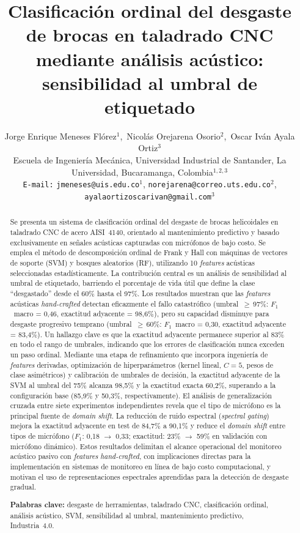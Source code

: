 \documentclass[10pt,twocolumn]{article}
\title{\textbf{Clasificación ordinal del desgaste de brocas en taladrado CNC
mediante análisis acústico: sensibilidad al umbral de etiquetado}}
\author{
  Jorge Enrique Meneses Flórez$^{1}$,\,
  Nicolás Orejarena Osorio$^{2}$,\,
  Oscar Iván Ayala Ortiz$^{3}$\\[4pt]
  {\small Escuela de Ingeniería Mecánica, Universidad Industrial de Santander, La Universidad, Bucaramanga, Colombia$^{1,2,3}$}\\[4pt]
  {\small \texttt{E-mail:} \texttt{jmeneses@uis.edu.co}$^{1}$, \texttt{norejarena@correo.uts.edu.co}$^{2}$, \texttt{ayalaortizoscarivan@gmail.com}$^{3}$}
}
\date{}
\begin{document}
\maketitle

\begin{abstract}
Se presenta un sistema de clasificación ordinal del desgaste de brocas
helicoidales en taladrado CNC de acero AISI~4140, orientado al
mantenimiento predictivo y basado exclusivamente en señales acústicas
capturadas con micrófonos de bajo costo. Se emplea el método de
descomposición ordinal de Frank y Hall con máquinas de vectores de
soporte (SVM) y bosques aleatorios (RF), utilizando 10 \textit{features}
acústicas seleccionadas estadísticamente. La contribución central es un
análisis de sensibilidad al umbral de etiquetado, barriendo el porcentaje
de vida útil que define la clase ``desgastado'' desde el 60\% hasta el
97\%. Los resultados muestran que las \textit{features} acústicas
\textit{hand-crafted} detectan eficazmente el fallo catastrófico
(umbral~$\geq$\,97\%: $F_1$~macro = 0{,}46, exactitud adyacente = 98{,}6\%),
pero su capacidad disminuye para desgaste progresivo temprano
(umbral~$\geq$\,60\%: $F_1$~macro = 0{,}30, exactitud adyacente = 83{,}4\%).
Un hallazgo clave es que la exactitud adyacente permanece superior al 83\%
en todo el rango de umbrales, indicando que los errores de clasificación
nunca exceden un paso ordinal. Mediante una etapa de refinamiento que
incorpora ingeniería de \textit{features} derivadas, optimización de
hiperparámetros (kernel lineal, $C = 5$, pesos de clase asimétricos) y
calibración de umbrales de decisión, la exactitud adyacente de la SVM al
umbral del 75\% alcanza 98{,}5\% y la exactitud exacta 60{,}2\%,
superando a la configuración base (85{,}9\% y 50{,}3\%,
respectivamente). El análisis de generalización cruzada entre siete
experimentos independientes revela que el tipo de micrófono es la
principal fuente de \textit{domain shift}. La reducción de ruido espectral
(\textit{spectral gating}) mejora la exactitud adyacente en test de
84{,}7\% a 90{,}1\% y reduce el \textit{domain shift} entre tipos de
micrófono ($F_1$: 0{,}18 $\rightarrow$ 0{,}33; exactitud: 23\%
$\rightarrow$ 59\% en validación con micrófono dinámico). Estos
resultados delimitan el alcance operacional del monitoreo acústico pasivo
con \textit{features} \textit{hand-crafted}, con implicaciones directas
para la implementación en sistemas de monitoreo en línea de bajo costo
computacional, y motivan el uso de representaciones espectrales aprendidas
para la detección de desgaste gradual.

\vspace{6pt}
\noindent\textbf{Palabras clave:} desgaste de herramientas, taladrado CNC,
clasificación ordinal, análisis acústico, SVM, sensibilidad al umbral,
mantenimiento predictivo, Industria~4.0.
\end{abstract}
\end{document}
